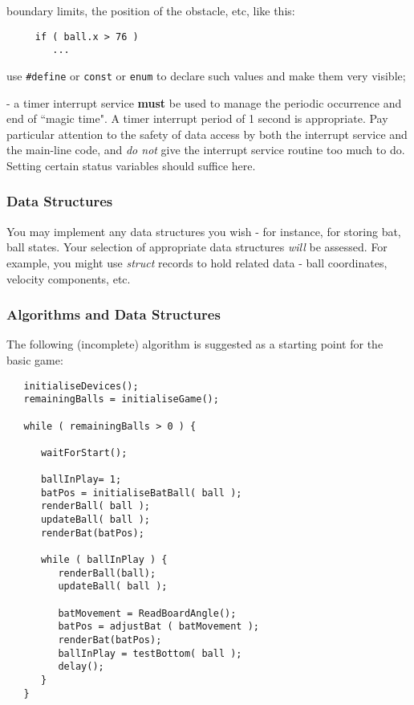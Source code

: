 \documentclass[a4paper]{article}
\begin{document}
{\begin{description}
  boundary limits, the position of the obstacle, etc, like this:
\begin{verbatim}
     if ( ball.x > 76 )
        ...
\end{verbatim}
  use \texttt{#define} or \texttt{const} or \texttt{enum} to declare such
  values and make them very visible;
\item [Use of a Timer Interrupt] - a timer interrupt service {\bf
    must} be used to manage the periodic occurrence and end of ``magic
  time".  A timer interrupt period of 1 second is appropriate. Pay
  particular attention to the safety of data access by both the
  interrupt service and the main-line code, and \emph{do not} give the
  interrupt service routine too much to do. Setting certain status
  variables should suffice here.
\end{description}


\subsubsection{Data Structures}
You may implement any data structures you wish - for instance, for
storing bat, ball states.  Your selection of appropriate data
structures \emph{will} be assessed.  For example, you might use {\it
  struct} records to hold related data - ball coordinates, velocity
components, etc.

\clearpage
\subsubsection{Algorithms and Data Structures}
The following (incomplete) algorithm is suggested as a starting point
for the basic game:

\begin{verbatim}
   initialiseDevices();
   remainingBalls = initialiseGame();

   while ( remainingBalls > 0 ) {

      waitForStart();

      ballInPlay= 1;
      batPos = initialiseBatBall( ball );
      renderBall( ball );
      updateBall( ball );
      renderBat(batPos);

      while ( ballInPlay ) {
         renderBall(ball);
         updateBall( ball );

         batMovement = ReadBoardAngle();
         batPos = adjustBat ( batMovement );
         renderBat(batPos);
         ballInPlay = testBottom( ball );
         delay();
      }
   }
 \end{verbatim}


}
\end{document}
